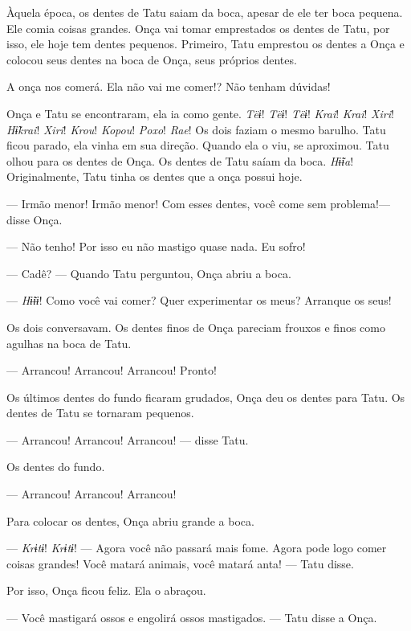 Àquela época, os dentes de Tatu saiam da boca, apesar de ele ter boca
pequena. Ele comia coisas grandes. Onça vai tomar emprestados os dentes
de Tatu, por isso, ele hoje tem dentes pequenos. Primeiro, Tatu
emprestou os dentes a Onça e colocou seus dentes na boca de Onça, seus
próprios dentes. 

A onça nos comerá. Ela não vai me comer!? Não tenham dúvidas! 

Onça e Tatu se encontraram, ela ia como gente. \textit{Tëɨ}! \textit{Tëɨ}! \textit{Tëɨ}! \textit{Krai}!
\textit{Krai}! \textit{Xiri}! \textit{Hɨ̃krai}! \textit{Xiri}! \textit{Krou}! \textit{Kopou}! \textit{Poxo}! \textit{Rae}! Os dois faziam o mesmo
barulho. Tatu ficou parado, ela vinha em sua direção. Quando ela o viu, se
aproximou. Tatu olhou para os dentes de Onça. Os dentes de Tatu saíam da
boca. \textit{Hɨ̃ɨa}! Originalmente, Tatu tinha os dentes que a onça possui hoje. 

--- Irmão menor! Irmão menor! Com esses dentes, você come sem
problema!--- disse Onça. 


--- Não tenho! Por isso eu não mastigo quase nada. Eu sofro! 

--- Cadê? --- Quando Tatu perguntou, Onça abriu a boca. 

--- \textit{Hɨ̃ɨɨ}! Como você vai comer? Quer experimentar os meus? Arranque
os seus! 

Os dois conversavam. Os dentes finos de Onça pareciam frouxos e finos
como agulhas na boca de Tatu.

--- Arrancou! Arrancou! Arrancou! Pronto! 

Os últimos dentes do fundo ficaram grudados, Onça deu os dentes para
Tatu. Os dentes de Tatu se tornaram pequenos.

--- Arrancou! Arrancou! Arrancou! --- disse Tatu.

Os dentes do fundo. 

--- Arrancou! Arrancou! Arrancou! 

Para colocar os dentes, Onça abriu grande a boca. 

--- \textit{Krɨtɨ}! \textit{Krɨtɨ}! --- Agora você não passará mais fome. Agora pode logo
comer coisas grandes! Você matará animais, você matará anta! --- Tatu
disse. 

Por isso, Onça ficou feliz. Ela o abraçou. 

--- Você mastigará ossos e engolirá ossos mastigados. --- Tatu disse a
 Onça.

